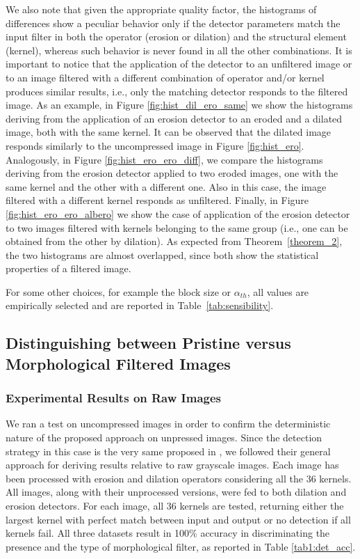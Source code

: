\documentclass[review]{elsarticle}
\begin{document}
We also note that given the appropriate quality factor, the histograms of differences show a peculiar behavior only if the detector parameters match the input filter in both the operator (erosion or dilation) and the structural element (kernel), whereas such behavior is never found in all the other combinations. It is important to notice that the application of the detector to an unfiltered image or to an image filtered with a different combination of operator and/or kernel produces similar results, i.e., only the matching detector responds to the filtered image. As an example, in Figure \ref{fig:hist_dil_ero_same} we show the histograms deriving from the application of an erosion detector to an eroded and a dilated image, both with the same kernel. It can be observed that the dilated image responds similarly to the uncompressed image in Figure \ref{fig:hist_ero}. Analogously, in Figure \ref{fig:hist_ero_ero_diff}, we compare the histograms deriving from the erosion detector applied to two eroded images, one with the same kernel and the other with a different one. Also in this case, the image filtered with a different kernel responds as unfiltered. Finally, in Figure \ref{fig:hist_ero_ero_albero} we show the case of application of the erosion detector to two images filtered with kernels belonging to the same group (i.e., one can be obtained from the other by dilation). As expected from Theorem~\ref{theorem_2}, the two histograms are almost overlapped, since both show the statistical properties of a filtered image.

For some other choices, for example the block size or $\alpha_{th}$, all values are empirically selected and are reported in Table~\ref{tab:sensibility}. 

\subsection{Distinguishing between Pristine versus Morphological Filtered Images}
\label{sec:compr_res}

\subsubsection{Experimental Results on Raw Images}

We ran a test on uncompressed images in order to confirm the deterministic nature of the proposed approach on unpressed images. Since the detection strategy in this case is the very same proposed in \cite{de2017detecting}, we followed their general approach for deriving results relative to raw grayscale images. Each image has been processed with erosion and dilation operators considering all the 36 kernels.
All images, along with their unprocessed versions, were fed to both dilation and erosion detectors. For each image, all 36 kernels are tested, returning either the largest kernel with perfect match between input and output or no detection if all kernels fail. All three datasets result in 100\% accuracy in discriminating the presence and the type of morphological filter, as reported in Table \ref{tab1:det_acc}.
\end{document}
